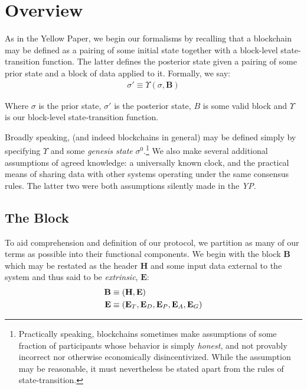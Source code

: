 \section{Overview}\label{sec:overview}

As in the Yellow Paper, we begin our formalisms by recalling that a blockchain may be defined as a pairing of some initial state together with a block-level state-transition function. The latter defines the posterior state given a pairing of some prior state and a block of data applied to it. Formally, we say:
\begin{align}\label{eq:statetransition}
\sigma' \equiv \Upsilon(\sigma, \mathbf{B})
\end{align}

Where $\sigma$ is the prior state, $\sigma'$ is the posterior state, $B$ is some valid block and $\Upsilon$ is our block-level state-transition function.

Broadly speaking, \Jam (and indeed blockchains in general) may be defined simply by specifying $\Upsilon$ and some \emph{genesis state} $\sigma^0$.\footnote{Practically speaking, blockchains sometimes make assumptions of some fraction of participants whose behavior is simply \emph{honest}, and not provably incorrect nor otherwise economically disincentivized. While the assumption may be reasonable, it must nevertheless be stated apart from the rules of state-transition.} We also make several additional assumptions of agreed knowledge: a universally known clock, and the practical means of sharing data with other systems operating under the same consensus rules. The latter two were both assumptions silently made in the \emph{YP}.

\subsection{The Block}

To aid comprehension and definition of our protocol, we partition as many of our terms as possible into their functional components. We begin with the block $\mathbf{B}$ which may be restated as the header $\mathbf{H}$ and some input data external to the system and thus said to be \emph{extrinsic}, $\mathbf{E}$:
\begin{align}
  \label{eq:block}\mathbf{B} &\equiv (\mathbf{H}, \mathbf{E}) \\
  \label{eq:extrinsic}\mathbf{E} &\equiv (\mathbf{E}_T, \mathbf{E}_D, \mathbf{E}_P, \mathbf{E}_A, \mathbf{E}_G)
\end{align}

